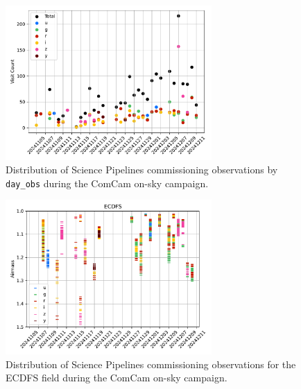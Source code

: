 \begin{figure}
    \begin{center}
        \includegraphics[width=0.7\textwidth]{observations_figures/comcam_science_visit_count_day_obs.pdf}
    \end{center}
    \caption{Distribution of Science Pipelines commissioning observations by \texttt{day\_obs} during the ComCam on-sky campaign.}
    \label{fig:comcam_science_day_obs}
\end{figure}

\begin{figure}
    \begin{center}
        \includegraphics[width=0.7\textwidth]{observations_figures/comcam_science_airmass_day_obs_ecdfs.pdf}
    \end{center}
    \caption{Distribution of Science Pipelines commissioning observations for the ECDFS field during the ComCam on-sky campaign.}
    \label{fig:comcam_science_day_obs}
\end{figure}